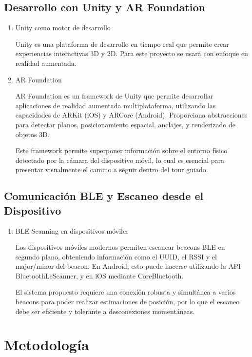 \documentclass{article}
\begin{document}
\subsection{Desarrollo con Unity y AR Foundation}
\begin{enumerate}[label=\thesubsection.\arabic*]
    \item Unity como motor de desarrollo
    
    Unity es una plataforma de desarrollo en tiempo real que permite crear experiencias interactivas 3D y 2D. Para este proyecto se usará con enfoque en realidad aumentada.

    \item AR Foundation
    
    AR Foundation es un framework de Unity que permite desarrollar aplicaciones de realidad aumentada multiplataforma, utilizando las capacidades de ARKit (iOS) y ARCore (Android). Proporciona abstracciones para detectar planos, posicionamiento espacial, anclajes, y renderizado de objetos 3D.

    Este framework permite superponer información sobre el entorno físico detectado por la cámara del dispositivo móvil, lo cual es esencial para presentar visualmente el camino a seguir dentro del tour guiado.

\end{enumerate}

\subsection{Comunicación BLE y Escaneo desde el Dispositivo}
\begin{enumerate}[label=\thesubsection.\arabic*]
    \item BLE Scanning en dispositivos móviles
    
    Los dispositivos móviles modernos permiten escanear beacons BLE en segundo plano, obteniendo información como el UUID, el RSSI y el major/minor del beacon.
    En Android, esto puede hacerse utilizando la API BluetoothLeScanner, y en iOS mediante CoreBluetooth.

    El sistema propuesto requiere una conexión robusta y simultánea a varios beacons para poder realizar estimaciones de posición, por lo que el escaneo debe ser eficiente y tolerante a desconexiones momentáneas.
\end{enumerate}


\section{Metodología}
\end{document}

